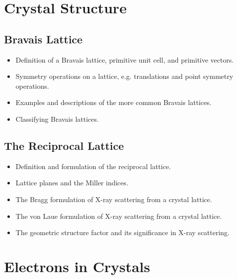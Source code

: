 



\tableofcontents

\section{Crystal Structure}

\subsection{Bravais Lattice}
\begin{itemize}

    \item Definition of a Bravais lattice, primitive unit cell, and primitive vectors.

    \item Symmetry operations on a lattice, e.g. translations and point symmetry operations.

    \item Examples and descriptions of the more common Bravais lattices.

    \item Classifying Bravais lattices.

\end{itemize}

\subsection{The Reciprocal Lattice}
\begin{itemize}

    \item Definition and formulation of the reciprocal lattice.

    \item Lattice planes and the Miller indices.

    \item The Bragg formulation of X-ray scattering from a crystal lattice.

    \item The von Laue formulation of X-ray scattering from a crystal lattice.

    \item The geometric structure factor and its significance in X-ray scattering.

\end{itemize}

\section{Electrons in Crystals}

